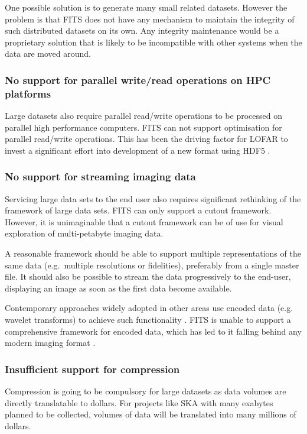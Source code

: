 \documentclass[final,authoryear,5p,times,twocolumn]{elsarticle}
\begin{document}
One possible solution is to generate many small related datasets. However
the problem is that FITS does not have any mechanism to maintain the
integrity of such distributed datasets on its own. Any integrity
maintenance would be a proprietary solution that is likely to be
incompatible with other systems when the data are moved around.

\subsubsection{No support for parallel write/read operations on HPC platforms}

Large datasets also require parallel read/write operations to be processed on parallel high performance
computers. FITS can not support optimisation for parallel read/write operations. This has been
the driving factor for LOFAR to invest a significant effort into development of a new format using
HDF5  \citep{2012ASPC..461..283A}.

\subsubsection{No support for streaming imaging data}

Servicing large data sets to the end user also requires significant
rethinking of the framework of large data sets. FITS can only support a
cutout framework.  However, it is unimaginable that a cutout framework
can be of use for visual exploration of multi-petabyte imaging data.

A reasonable framework should be able to support multiple representations
of the same data (e.g.\ multiple resolutions or fidelities), preferably
from a single master file. It should also be possible to stream the data
progressively to the end-user, displaying an image as soon
as the first data become available.

Contemporary approaches widely adopted in other areas use encoded data
(e.g. wavelet transforms) to achieve such functionality \citep{2003SPIE.5150..791T}. FITS is unable to support
a comprehensive framework for encoded data, which has led to it
falling behind any modern imaging format \citep[see e.g.][]{2013arXiv1307.5123K}.

\subsubsection{Insufficient support for compression}

Compression is going to be compulsory for large datasets as data volumes
are directly translatable to dollars. For projects like SKA with many
exabytes planned to be collected, volumes of data will be translated into
many millions of dollars.
\end{document}
